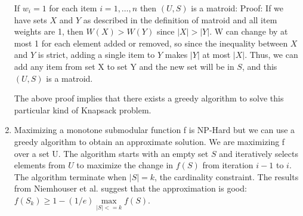 \documentclass[]{article}
\begin{document}
\begin{enumerate}
	If $w_i = 1$ for each item $i=1,\dots,n$ then $(U,S)$ is a matroid:
	Proof:
	If we have sets $X$ and $Y$ as described in the definition of matroid and all item weights are 1, then $W(X) > W(Y)$ since $|X| > |Y|$. W can change by at most 1 for each element added or removed, so since the inequality between $X$ and $Y$ is strict, adding a single item to $Y$ makes $|Y|$ at most $|X|$.  Thus, we can add any item from set X to set Y and the new set will be in $S$, and this $(U,S)$ is a matroid.
	
	The above proof implies that there exists a greedy algorithm to solve this particular kind of Knapsack problem.
	
	\item Maximizing a monotone submodular function f is NP-Hard but we can use a greedy algorithm to obtain an approximate solution. We are maximizing f over a set U. The algorithm starts with an empty set $S$ and iteratively selects elements from $U$ to maximize the change in $f(S)$ from iteration $i-1$ to $i$. The algorithm terminate when $|S| = k$, the cardinality constraint. The results from Niemhouser et al. suggest that the approximation is good: $f(S_k)\ge 1 - (1/e)  \max\limits_{|S|<=k} f(S)$.
	
\end{enumerate}
	\nocite{krause}
	\nocite{cn}
	\nocite{newman}
	


\end{document}
